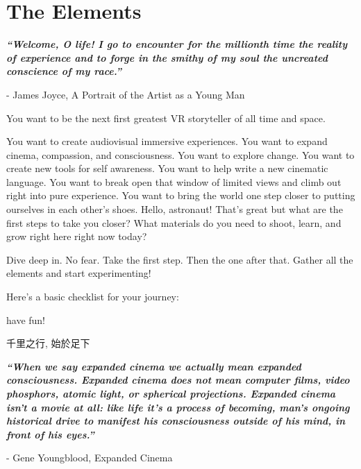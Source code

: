 \chapter{The Elements}
\pagecolor{white}
\label{chap:1}
\begin{fullwidth}

{\itshape\bfseries “Welcome, O life! I go to encounter for the millionth time the reality of experience and to forge in the smithy of my soul the uncreated conscience of my race.”}

- James Joyce, A Portrait of the Artist as a Young Man
\vspace{\baselineskip}

\problem

{\large You want to be the next first greatest VR storyteller of all time and space. \par}

You want to create audiovisual immersive experiences. You want to expand cinema, compassion, and consciousness. You want to explore change. You want to create new tools for self awareness. You want to help write a new cinematic language. You want to break open that window of limited views and climb out right into pure experience. You want to bring the world one step closer to putting ourselves in each other’s shoes. Hello, astronaut! That’s great but what are the first steps to take you closer? What materials do you need to shoot, learn, and grow right here right now today?

\solution

{\large Dive deep in. No fear. Take the first step. Then the one after that. Gather all the elements and start experimenting! \par}

Here’s a basic checklist for your journey:
\clearpage
{}




have fun!

\begin{CJK*}{UTF8}{gbsn}
千里之行, 始於足下
\clearpage\end{CJK*}

{\itshape\bfseries “When we say expanded cinema we actually mean expanded consciousness. Expanded cinema does not mean computer films, video phosphors, atomic light, or spherical projections. Expanded cinema isn't a movie at all: like life it's a process of becoming, man's ongoing historical drive to manifest his consciousness outside of his mind, in front of his eyes.”}

- Gene Youngblood, Expanded Cinema
\vspace{\baselineskip}

\clearpage
\end{fullwidth}
